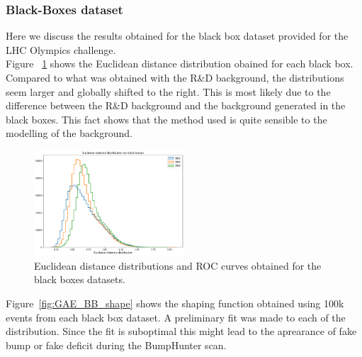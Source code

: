 \documentclass[letterpaper,11pt]{article}
\begin{document}
\subsubsection{Black-Boxes dataset}
\label{sec:BB}

\noindent Here we discuss the results obtained for the black box dataset provided for the LHC Olympics challenge.\\

\noindent Figure ~\ref{fig:GAE_BB_dist} shows the Euclidean distance distribution obained for each black box.
Compared to what was obtained with the R\&D background, the distributions seem larger and globally shifted to the right.
This is most likely due to the difference between the R\&D background and the background generated in the black boxes.
This fact shows that the method used is quite sensible to the modelling of the background.

\begin{figure}[h!]
\centering
\includegraphics[width=0.5\textwidth]{img/distance_all.pdf}
\caption{Euclidean distance distributions and ROC curves obtained for the black boxes datasets.}
\label{fig:GAE_BB_dist}
\end{figure}

\noindent Figure~\ref{fig:GAE_BB_shape} shows the shaping function obtained using 100k events from each black box dataset. A preliminary fit was made to each of the distribution. Since the fit is suboptimal this might lead to the aprearance of fake bump or fake deficit during the BumpHunter scan.
\end{document}
